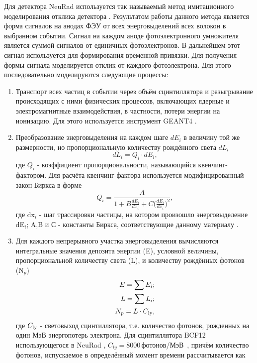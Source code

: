 Для детектора NeuRad используется так называемый метод имитационного моделирования отклика детектора \cite{vitalik}. 
Результатом работы данного метода является форма сигналов на анодах ФЭУ от всех энерговыделений всех волокон в выбранном событии. Сигнал на каждом аноде фотоэлектронного умножителя является суммой сигналов от единичных фотоэлектронов. В дальнейшем этот сигнал используется для формирования временной привязки. Для получения формы сигнала моделируется отклик от каждого фотоэлектрона. Для этого последовательно моделируются следующие процессы:
\begin{enumerate}
	\item Транспорт всех частиц в событии через объём сцинтиллятора и разыгрывание происходящих с ними физических процессов, включающих ядерные и электромагнитные взаимодействия, в частности, потери энергии на ионизацию. Для этого используется инструмент GEANT4 \cite{geant}.
	\item Преобразование энерговыделения на каждом шаге $dE_i$ в величину той же размерности, но пропорциональную количеству рождённого света $dL_i$
	\begin{equation}
	\label{eq:lyield}
	dL_i = Q_i\cdot dE_i,
	\end{equation}
	где $Q_i$ - коэффициент пропорциональности, называющийся квенчинг-фактором. 
	Для расчёта квенчинг-фактора используется модифицированный закон Биркса в форме
	\begin{equation}
	\label{eq:quenching}
	Q_i = \frac{A}{1+B\frac{dE_i}{dx_i}+C\big(\frac{dE_i}{dx_i}\big)^2},
	\end{equation}
	где dx$_i$ - шаг трассировки частицы, на котором произошло энерговыделение dE$_i$; A,B и С - константы Биркса, соответствующие данному материалу \cite{vratislav}.
	\item Для каждого непрерывного участка энерговыделения вычисляются интегральные значения депозита энергии (E), условной величины, пропорциональной количеству света (L), и количеству рождённых фотонов (N$_p$)
	\begin{eqnarray}
	E=\sum E_i;\nonumber \\
	L=\sum L_i;\\
	N_p=L\cdot C_{\rm ly},\nonumber 
	\end{eqnarray}
	где $C_{\rm ly}$ - световыход сцинтиллятора, т.е. количество фотонов, рожденных на один МэВ энергопотерь электрона. Для сцинтиллятора BCF12 использующегося в NeuRad , $C_{ly} = 8000$\,фотонов/МэВ~\cite{crystals},
	причём количество фотонов, испускаемое в определённый момент времени рассчитывается как

\end{enumerate}
